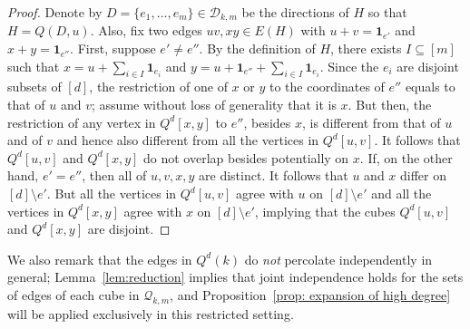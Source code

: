 \documentclass{article}
\theoremstyle{definition}
\newcommand{\cD}{\mathcal{D}}
\newcommand{\cQ}{\mathcal{Q}}
\begin{document}
\begin{proof}
Denote by $D=\{e_1,\ldots,e_m\}\in \cD_{k,m}$ be the directions of $H$ so that $H=Q(D,u)$.
Also, fix two edges $uv,xy\in E(H)$ with $u+v=\mathbf{1}_{e'}$ and $x+y=\mathbf{1}_{e''}$. 
First, suppose $e'\neq e''$. By the definition of $H$, there exists $I\subseteq [m]$ such that $x=u+\sum_{i\in I} \mathbf{1}_{e_i}$ and $y=u+\mathbf{1}_{e''}+\sum_{i\in I} \mathbf{1}_{e_i}$. Since the $e_i$ are disjoint subsets of $[d]$, the restriction of one of $x$ or $y$ to the coordinates of $e''$ equals to that of $u$ and $v$; assume without loss of generality that it is $x$. But then, the restriction of any vertex in $Q^d[x,y]$ to $e''$, besides $x$, is different from that of $u$ and of $v$ and hence also different from all the vertices in $Q^d[u,v]$. It follows that $Q^d[u,v]$ and $Q^d[x,y]$ do not overlap besides potentially on $x$. 
If, on the other hand, $e'=e''$, then all of $u,v,x,y$ are distinct. It follows that $u$ and $x$ differ on $[d]\setminus e'$. But all the vertices in $Q^d[u,v]$ agree with $u$ on $[d]\setminus e'$ and all the vertices in $Q^d[x,y]$ agree with $x$ on $[d]\setminus e'$, implying that the cubes $Q^d[u,v]$ and $Q^d[x,y]$ are disjoint.
\end{proof}

We also remark that the edges in $Q^d(k)$ do \emph{not} percolate independently in general; Lemma~\ref{lem:reduction} implies that joint independence holds for the sets of edges of each cube in $\cQ_{k,m}$, and Proposition~\ref{prop: expansion of high degree} will be applied exclusively in this restricted setting. 
\end{document}
